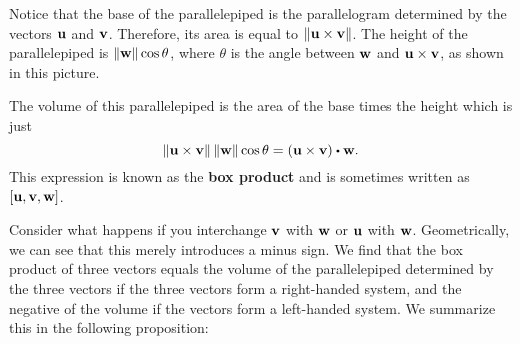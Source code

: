 Notice that the base of the parallelepiped is the parallelogram
determined by the vectors $\vect{u}$ and $\vect{v}$. Therefore, its
area is equal to $\norm{\vect{u}\times\vect{v}}$. The height of the
parallelepiped is $\norm{\vect{w}}\cos\theta$, where $\theta$ is the
angle between $\vect{w}$ and $\vect{u}\times\vect{v}$, as shown in
this picture.
\begin{center}
\end{center}
The volume of this parallelepiped is the area of the base times the
height which is just
\begin{equation*}
  \norm{\vect{u}\times \vect{v}} \norm{\vect{w}} \cos \theta =
  (\vect{u}\times\vect{v}) \dotprod \vect{w}.
\end{equation*}
This expression is known as the \textbf{box product}%
 and is sometimes written as
$\boxprod{\vect{u},\vect{v},\vect{w}}$.

Consider what happens if you interchange $\vect{v}$ with $\vect{w}$ or
$\vect{u}$ with $\vect{w}$.  Geometrically, we can see that this
merely introduces a minus sign. We find that the box product of three
vectors equals the volume of the parallelepiped determined by the
three vectors if the three vectors form a right-handed system, and the
negative of the volume if the vectors form a left-handed system.
We summarize this in the following proposition:

